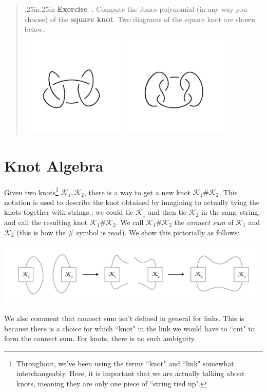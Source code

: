 \documentclass[12 pt]{article}
\newcounter{exercise}[section]
\newenvironment{exercise}{\refstepcounter{exercise}\par\bigskip \begin{quotation}{}{\leftmargin .25in\rightmargin .25in}
	\noindent \textbf{Exercise~\thesection.\theexercise }  \rmfamily}{\end{quotation}\par\bigskip}
\begin{document}
\begin{exercise}
Compute the Jones polynomial (in any way you choose) of the \textbf{square knot}. Two diagrams of the square knot are shown below.\\
\includegraphics[height=2in]{square_knot_2.jpg}
\includegraphics[height=2in]{square_knot_1.jpg}
\end{exercise}



\newpage
\section{Knot Algebra}
Given two knots\footnote{Throughout, we've been using the terms ``knot" and ``link" somewhat interchangeably. Here, it is important that we are actually talking about knots, meaning they are only one piece of ``string tied up".} $\mathcal{K}_1,\mathcal{K}_2$, there is a way to get a new knot $\mathcal{K}_1\#\mathcal{K}_2$. This notation is used to describe the knot obtained by imagining to actually tying the knots together with strings.; we could tie $\mathcal{K}_1$ and then tie $\mathcal{K}_2$ in the same string, and call the resulting knot $\mathcal{K}_1\#\mathcal{K}_2$. We call $\mathcal{K}_1\#\mathcal{K}_2$ the \textit{connect sum} of $\mathcal{K}_1$ and $\mathcal{K}_2$ (this is how the $\#$ symbol is read). We show this pictorially as follows:\\
\begin{center}
\includegraphics[height = 1.2in]{knot_sum.jpg}
\end{center}
We also comment that connect sum isn't defined in general for links. This is because there is a choice for which ``knot" in the link we would have to ``cut" to form the connect sum. For knots, there is no such ambiguity.
\end{document}
